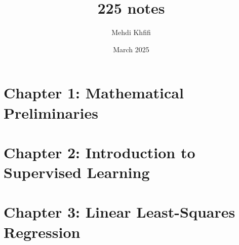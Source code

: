 \documentclass{article}
\title{225 notes}
\author{Mehdi Khfifi}
\date{March 2025}
\begin{document}
\maketitle

\section{Chapter 1: Mathematical Preliminaries}




\section{Chapter 2: Introduction to Supervised Learning}



\section{Chapter 3: Linear Least-Squares Regression}
\end{document}
